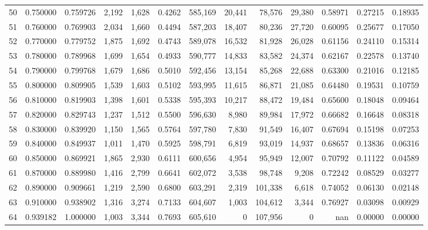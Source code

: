 \begin{tabular}{rrrrrrrrrrrrr}
50 &  0.750000 &  0.759726 &   2,192 &  1,628 &                                     0.4262 &  585,169 &   20,441 &   78,576 &   29,380 &  0.58971 &  0.27215 &  0.18935 \\
51 &  0.760000 &  0.769903 &   2,034 &  1,660 &                                     0.4494 &  587,203 &   18,407 &   80,236 &   27,720 &  0.60095 &  0.25677 &  0.17050 \\
52 &  0.770000 &  0.779752 &   1,875 &  1,692 &                                     0.4743 &  589,078 &   16,532 &   81,928 &   26,028 &  0.61156 &  0.24110 &  0.15314 \\
53 &  0.780000 &  0.789968 &   1,699 &  1,654 &                                     0.4933 &  590,777 &   14,833 &   83,582 &   24,374 &  0.62167 &  0.22578 &  0.13740 \\
54 &  0.790000 &  0.799768 &   1,679 &  1,686 &                                     0.5010 &  592,456 &   13,154 &   85,268 &   22,688 &  0.63300 &  0.21016 &  0.12185 \\
55 &  0.800000 &  0.809905 &   1,539 &  1,603 &                                     0.5102 &  593,995 &   11,615 &   86,871 &   21,085 &  0.64480 &  0.19531 &  0.10759 \\
56 &  0.810000 &  0.819903 &   1,398 &  1,601 &                                     0.5338 &  595,393 &   10,217 &   88,472 &   19,484 &  0.65600 &  0.18048 &  0.09464 \\
57 &  0.820000 &  0.829743 &   1,237 &  1,512 &                                     0.5500 &  596,630 &    8,980 &   89,984 &   17,972 &  0.66682 &  0.16648 &  0.08318 \\
58 &  0.830000 &  0.839920 &   1,150 &  1,565 &                                     0.5764 &  597,780 &    7,830 &   91,549 &   16,407 &  0.67694 &  0.15198 &  0.07253 \\
59 &  0.840000 &  0.849937 &   1,011 &  1,470 &                                     0.5925 &  598,791 &    6,819 &   93,019 &   14,937 &  0.68657 &  0.13836 &  0.06316 \\
60 &  0.850000 &  0.869921 &   1,865 &  2,930 &                                     0.6111 &  600,656 &    4,954 &   95,949 &   12,007 &  0.70792 &  0.11122 &  0.04589 \\
61 &  0.870000 &  0.889980 &   1,416 &  2,799 &                                     0.6641 &  602,072 &    3,538 &   98,748 &    9,208 &  0.72242 &  0.08529 &  0.03277 \\
62 &  0.890000 &  0.909661 &   1,219 &  2,590 &                                     0.6800 &  603,291 &    2,319 &  101,338 &    6,618 &  0.74052 &  0.06130 &  0.02148 \\
63 &  0.910000 &  0.938902 &   1,316 &  3,274 &                                     0.7133 &  604,607 &    1,003 &  104,612 &    3,344 &  0.76927 &  0.03098 &  0.00929 \\
64 &  0.939182 &  1.000000 &   1,003 &  3,344 &                                     0.7693 &  605,610 &        0 &  107,956 &        0 &      nan &  0.00000 &  0.00000 \\
\bottomrule
\end{tabular}
